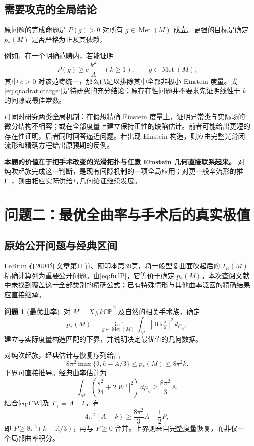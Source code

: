 \documentclass[11pt,a4paper]{article}
\newcommand{\Ric}{\operatorname{Ric}}
\newcommand{\Met}{\operatorname{Met}}
\newcommand{\CP}{\mathbb{CP}}
\newcommand{\dd}{\,d\mu_g}
\newcommand{\key}[1]{\textbf{\color{ink}#1}}
\theoremstyle{definition}
\newtheorem{problem}{问题}[section]
\numberwithin{equation}{section}
\begin{document}
\subsection{需要攻克的全局结论}
原问题的完成命题是 $P(g)>0$ 对所有 $g\in\Met(M)$ 成立。更强的目标是确定 $p_*(M)$ 是否严格为正及其依赖。

例如，在一个明确范畴内，若能证明
\begin{equation}
P(g)\ge c\,\frac{k^2}{A}\quad(k\ge1),\qquad g\in\Met(M),\label{eq:quadratictarget}
\end{equation}
其中 $c>0$ 对该范畴统一，那么已足以排除其中全部非极小 Einstein 度量。式\eqref{eq:quadratictarget}是待研究的充分结论；原存在性问题并不要求先证明线性于 $k$ 的间隙或最佳常数。

可同时研究两类全局机制：在假想精确 Einstein 度量上，证明异常类与实际场的微分结构不相容；或在全部度量上建立保持正性的缺陷估计。前者可能给出更短的存在性证明，后者同时回答逼近问题。若出现 Einstein 构造，则应由完整光滑闭流形和精确方程给出原预期的反例。

\key{本题的价值在于把手术改变的光滑拓扑与任意 Einstein 几何直接联系起来。} 对纯吹起族完成这一判断，是现有间隙机制的一项全局应用；对更一般辛流形的推广，则由相应实际供给与几何论证继续发展。

\section{问题二：最优全曲率与手术后的真实极值}
\label{sec:optimum}

\subsection{原始公开问题与经典区间}
LeBrun 在2004年文章第11节、预印本第39页，将一般型复曲面吹起后的 $I_R(M)$ 精确计算列为重要公开问题\cite{LeBrun2004}。由\eqref{eq:fullP}，它等价于确定 $p_*(M)$。本次查阅文献中未找到覆盖这一全部类别的精确公式；已有特殊情形与其他曲率泛函的精确结果应直接继承。

\begin{problem}[最优曲率]
对 $M=X\#k\overline{\CP}^{\,2}$ 及自然的相关手术族，确定
\[
p_*(M)=\inf_{g\in\Met(M)}\int_M|\Ric_g^\circ|^2\dd,
\]
建立与实际度量构造匹配的下界，并说明决定最优值的几何数据。
\end{problem}

对纯吹起族，经典估计与恢复序列给出
\begin{equation}
8\pi^2\max\{0,k-A/3\}\le p_*(M)\le8\pi^2k.\label{eq:classicinterval}
\end{equation}
下界可直接推导。经典曲率估计为
\[
\int_M\left(\frac{s^2}{24}+2|W^+|^2\right)\dd\ge\frac{8\pi^2}{3}A.
\]
结合\eqref{eq:CW}及 $T_+=A-k$，有
\[
4\pi^2(A-k)\ge\frac{8\pi^2}{3}A-\frac12P,
\]
即 $P\ge8\pi^2(k-A/3)$，再与 $P\ge0$ 合并。上界则来自完整度量恢复，而非仅一个局部曲率积分。
\end{document}
